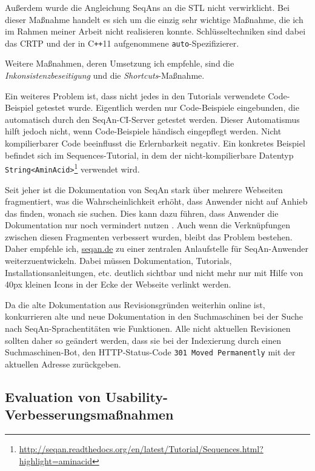 Außerdem wurde die Angleichung SeqAns an die STL nicht verwirklicht. Bei dieser Maßnahme handelt es sich um die einzig sehr wichtige Maßnahme, die ich im Rahmen meiner Arbeit nicht realisieren konnte. Schlüsseltechniken sind dabei das CRTP und der in C\texttt{++}11 aufgenommene \texttt{auto}-Spezifizierer.

Weitere Maßnahmen, deren Umsetzung ich empfehle, sind die \textit{Inkonsistenzbeseitigung} und die \textit{Shortcuts}-Maßnahme.

Ein weiteres Problem ist, dass nicht jedes in den Tutorials verwendete Code-Beispiel getestet wurde. Eigentlich werden nur Code-Beispiele eingebunden, die automatisch durch den SeqAn-CI-Server getestet werden. Dieser Automatismus hilft jedoch nicht, wenn Code-Beispiele händisch eingepflegt werden. Nicht kompilierbarer Code beeinflusst die Erlernbarkeit negativ. Ein konkretes Beispiel befindet sich im Sequences-Tutorial, in dem der nicht-kompilierbare Datentyp \texttt{String<AminAcid>}\footnote{\url{http://seqan.readthedocs.org/en/latest/Tutorial/Sequences.html?highlight=aminacid}} verwendet wird.

Seit jeher ist die Dokumentation von SeqAn stark über mehrere Webseiten fragmentiert, was die Wahrscheinlichkeit erhöht, dass Anwender nicht auf Anhieb das finden, wonach sie suchen. Dies kann dazu führen, dass Anwender die Dokumentation nur noch vermindert nutzen \citep[vgl.][]{Jeong:kf}. Auch wenn die Verknüpfungen zwischen diesen Fragmenten verbessert wurden, bleibt das Problem bestehen. Daher empfehle ich, \href{http://www.seqan.de/}{seqan.de} zu einer zentralen Anlaufstelle für SeqAn-Anwender weiterzuentwickeln. Dabei müssen Dokumentation, Tutorials, Installationsanleitungen, etc. deutlich sichtbar und nicht mehr nur mit Hilfe von 40px kleinen Icons in der Ecke der Webseite verlinkt werden.

Da die alte Dokumentation aus Revisionsgründen weiterhin online ist, konkurrieren alte und neue Dokumentation in den Suchmaschinen bei der Suche nach SeqAn-Sprachentitäten wie Funktionen. Alle nicht aktuellen Revisionen sollten daher so geändert werden, dass sie bei der Indexierung durch einen Suchmaschinen-Bot, den HTTP-Status-Code \texttt{301 Moved Permanently} mit der aktuellen Adresse zurückgeben.


\subsection{Evaluation von Usability-Verbesserungsmaßnahmen}


